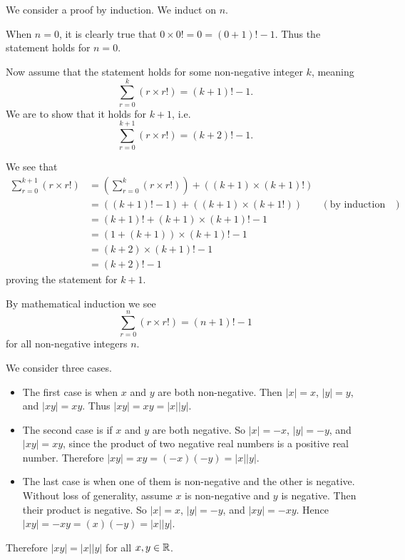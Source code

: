 \begin{questions}
    \item We consider a proof by induction. We induct on $n$.

    When $n = 0$, it is clearly true that $0 \times 0! = 0 = (0+1)! - 1$. Thus the statement holds for $n = 0$.

    Now assume that the statement holds for some non-negative integer $k$, meaning
    \[
        \sum_{r=0}^k (r\times r!) = (k+1)! - 1.
    \]
    We are to show that it holds for $k+1$, i.e.
    \[
        \sum_{r=0}^{k+1} (r\times r!) = (k+2)! - 1.
    \]

    We see that
    \begin{align*}
        \sum_{r=0}^{k+1} (r\times r!) &= \left(\sum_{r=0}^k (r\times r!)\right) + ((k+1) \times (k+1)!)\\
        &= ((k+1)! - 1) + ((k+1) \times (k+1!)) & (\text{by induction hypothesis})\\
        &= (k+1)! + (k+1) \times (k+1)! - 1\\
        &= (1 + (k+1))\times(k+1)! - 1\\
        &= (k+2) \times (k+1)! - 1\\
        &= (k+2)! - 1
    \end{align*}
    proving the statement for $k + 1$.

    By mathematical induction we see
    \[
        \sum_{r=0}^n (r\times r!) = (n+1)! - 1
    \]
    for all non-negative integers $n$.

    \item \begin{partquestions}{\roman*}
        \item We consider three cases.
        \begin{itemize}
            \item The first case is when $x$ and $y$ are both non-negative. Then $|x| = x$, $|y| = y$, and $|xy| = xy$. Thus $|xy| = xy = |x||y|$.
            \item The second case is if $x$ and $y$ are both negative. So $|x| = -x$, $|y| = -y$, and $|xy| = xy$, since the product of two negative real numbers is a positive real number. Therefore $|xy| = xy = (-x)(-y) = |x||y|$.
            \item The last case is when one of them is non-negative and the other is negative. Without loss of generality, assume $x$ is non-negative and $y$ is negative. Then their product is negative. So $|x| = x$, $|y| = -y$, and $|xy| = -xy$. Hence $|xy| = -xy = (x)(-y) = |x||y|$.
        \end{itemize}
        Therefore $|xy| = |x||y|$ for all $x, y \in \mathbb{R}$.


\end{partquestions}
\end{questions}
